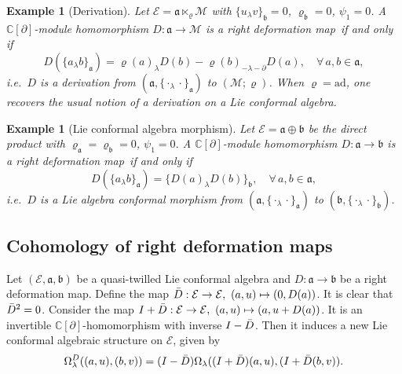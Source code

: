 \documentclass[a4paper,11pt]{article}
\def\Rg{\mathbb{C}[\partial]}
\def\Ep{\mathcal{E}}
\def\Vs{\mathfrak{a}}
\def\Ws{\mathfrak{b}}
\def\Mod{\mathcal{M}}
\def\rep{\varrho}
\def\la{\lambda}
\def\p{\partial}
\newcommand{\ad}{\mathrm{ad}}
\numberwithin{equation}{section}
\newtheorem{example}[theorem]{Example}
\begin{document}
 
\begin{example}[Derivation]\label{ex:conf-derivation}
Let $\Ep=\Vs\ltimes_\rep\Mod$ with $\{u_\la v\}_\Ws=0$, $\rep_\Ws=0$, $\psi_1=0$.
A $\Rg$-module homomorphism $D:\Vs\to\Mod$ is a right deformation map\ if and only if
\begin{equation}\label{eq:conf-derivation}
  D(\{a_\la b\}_\Vs)
  = \rep(a)_\la D(b) - \rep(b)_{-\la-\p}D(a),
  \quad \forall\,a,b\in\Vs,
\end{equation}
i.e.\ $D$ is a \textit{ derivation} from
$(\Vs,\{\cdot_\la\cdot\}_\Vs)$ to $(\Mod;\rep)$.  When $\rep=\ad$,
one  recovers the usual notion of a derivation on a Lie conformal algebra.
\end{example}
 
\begin{example}[Lie conformal  algebra morphism]\label{ex:conf-hom}
Let $\Ep=\Vs\oplus\Ws$ be the direct product with
$\rep_\Vs=\rep_\Ws=0$, $\psi_1=0$.
A $\Rg$-module homomorphism $D:\Vs\to\Ws$ is a right deformation map\ if and only if
\begin{equation}\label{eq:conf-Lie-hom}
  D(\{a_\la b\}_\Vs) = \{D(a)_\la D(b)\}_\Ws,
  \quad \forall\,a,b\in\Vs,
\end{equation}
i.e.\ $D$ is a \textit{ Lie algebra conformal morphism} from
$(\Vs,\{\cdot_\la\cdot\}_\Vs)$ to $(\Ws,\{\cdot_\la\cdot\}_\Ws)$.
\end{example}

\subsection{Cohomology of right deformation maps}
\label{subsec:cohom-I}

Let $(\Ep,\Vs,\Ws)$ be a quasi-twilled Lie conformal algebra and
$D:\Vs\to\Ws$ be a right deformation map. Define the map $\Bar{D}: \Ep \to \Ep,\ (a,u) \mapsto (0,D(a))$. It is  clear that $\Bar{D}^2=0$. 
Consider the map $I+\Bar{D}: \Ep \to \Ep,\ (a,u) \mapsto (a,u+D(a))$. It is an invertible $\mathbb{C}[\partial]$-homomorphism with inverse $I-\Bar{D}$. Then it induces a new Lie conformal algebraic structure on $\Ep$, given by 
\begin{align*}
\Omega^D_\lambda((a,u) ,(b,v))=(I-\Bar{D})\Omega_\lambda((I+\Bar{D})(a,u), (I+\Bar{D}(b,v)).     
\end{align*}
\end{document}
